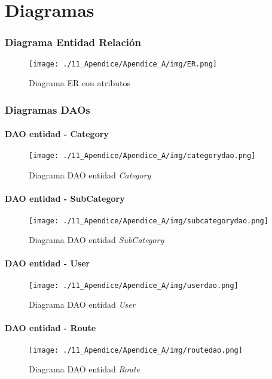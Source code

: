 \chapter[Diagramas]{
  \label{chp:diagramas}
  Diagramas
}
\thispagestyle{numberingStyle}
\pagestyle{numberingStyle}


\subsection{Diagrama Entidad Relación}
\begin{sidewaysfigure}[]
\texttt{[image: ./11\_Apendice/Apendice\_A/img/ER.png]}
\caption{Diagrama ER con atributos}
\end{sidewaysfigure}



\newpage
\subsection{Diagramas DAOs}

\subsubsection*{DAO entidad - Category}
\begin{figure}[H]
\centering
\texttt{[image: ./11\_Apendice/Apendice\_A/img/categorydao.png]}
\caption{Diagrama DAO entidad \textit{Category}}
\end{figure}


\subsubsection*{DAO entidad - SubCategory}
\begin{figure}[H]
\centering
\texttt{[image: ./11\_Apendice/Apendice\_A/img/subcategorydao.png]}
\caption{Diagrama DAO entidad \textit{SubCategory}}
\end{figure}


\subsubsection*{DAO entidad - User}
\begin{figure}[H]
\centering
\texttt{[image: ./11\_Apendice/Apendice\_A/img/userdao.png]}
\caption{Diagrama DAO entidad \textit{User}}
\end{figure}


\subsubsection*{DAO entidad - Route}
\begin{figure}[H]
\centering
\texttt{[image: ./11\_Apendice/Apendice\_A/img/routedao.png]}
\caption{Diagrama DAO entidad \textit{Route}}
\end{figure}


